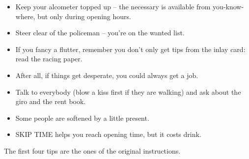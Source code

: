 
\begin{itemize}
\item Keep your alcometer topped up -- the necessary is available from you-know-where, but only during opening hours.
\item Steer clear of the policeman -- you're on the wanted list.
\item If you fancy a flutter, remember you don't only get tips from the inlay card: read the racing paper.
\item After all, if things get desperate, you could always get a job.
\item Talk to everybody (blow a kiss first if they are walking) and ask about the giro and the rent book.
\item Some people are softened by a little present.
\item SKIP TIME helps you reach opening time, but it costs drink.
\end{itemize}

{\small The first four tips are the ones of the original instructions.}

